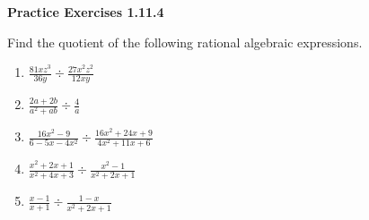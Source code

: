 \vspace{1ex}
\noindent\textbf{Practice Exercises 1.11.4}

\vspace{0.75ex}

Find the quotient of the following rational algebraic expressions. 

\begin{enumerate} 
	
	\item $\displaystyle \frac{81xz^3}{36y} \div \frac{27x^2z^2}{12xy}$ 
	\item $\displaystyle \frac{2a+2b}{a^2+ab} \div \frac{4}{a}$ 
	\item $\displaystyle \frac{16x^2-9}{6-5x-4x^2} \div \frac{16x^2+24x+9}{4x^2+11x+6}$
	\item $\displaystyle \frac{x^2+2x+1}{x^{2}+4x+3} \div \frac{x^2-1}{x^{2}+2x+1}$
	\item $\displaystyle \frac{x-1}{x+1} \div \frac{1-x}{x^2+2x+1}$
	
\end{enumerate}